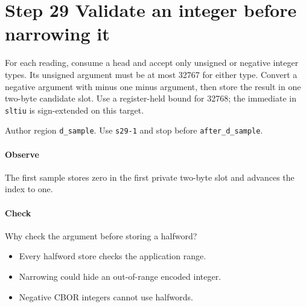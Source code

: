 \section{Step 29 Validate an integer before narrowing it}\label{cbor-s29}
For each reading, consume a head and accept only unsigned or negative integer types. Its unsigned argument must be at most 32767 for either type. Convert a negative argument with minus one minus argument, then store the result in one two-byte candidate slot. Use a register-held bound for 32768; the immediate in \texttt{sltiu} is sign-extended on this target.

Author region \texttt{d\_sample}. Use \texttt{s29-1} and stop before \texttt{after\_d\_sample}.

\paragraph{Observe} The first sample stores zero in the first private two-byte slot and advances the index to one.

\paragraph{Check} Why check the argument before storing a halfword?
\begin{itemize}
  \item[A.] Every halfword store checks the application range.
  \item[B.] Narrowing could hide an out-of-range encoded integer.
  \item[C.] Negative CBOR integers cannot use halfwords.
\end{itemize}
